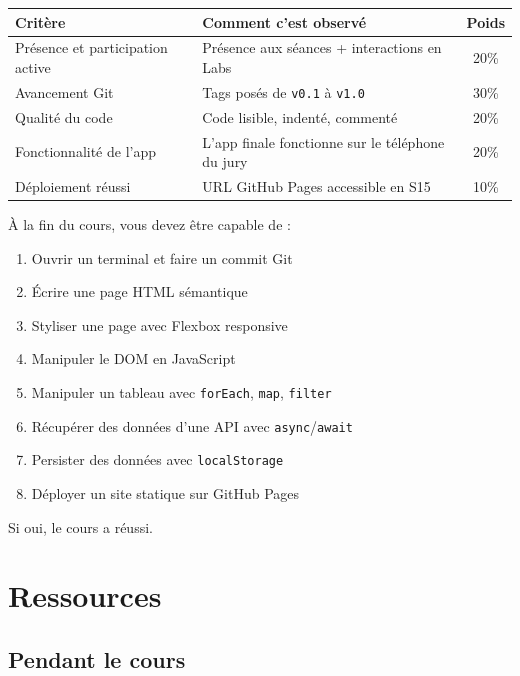 \documentclass[11pt,a4paper]{article}
\begin{document}
\begin{center}
\begin{tabular}{lp{8cm}c}
\toprule
\textbf{Critère} & \textbf{Comment c'est observé} & \textbf{Poids} \\
\midrule
Présence et participation active & Présence aux séances + interactions en Labs & 20\% \\
Avancement Git & Tags posés de \texttt{v0.1} à \texttt{v1.0} & 30\% \\
Qualité du code & Code lisible, indenté, commenté & 20\% \\
Fonctionnalité de l'app & L'app finale fonctionne sur le téléphone du jury & 20\% \\
Déploiement réussi & URL GitHub Pages accessible en S15 & 10\% \\
\bottomrule
\end{tabular}
\end{center}

\begin{retenirbox}
À la fin du cours, vous devez être capable de :
\begin{enumerate}[leftmargin=*,nosep]
  \item Ouvrir un terminal et faire un commit Git
  \item Écrire une page HTML sémantique
  \item Styliser une page avec Flexbox responsive
  \item Manipuler le DOM en JavaScript
  \item Manipuler un tableau avec \texttt{forEach}, \texttt{map}, \texttt{filter}
  \item Récupérer des données d'une API avec \texttt{async}/\texttt{await}
  \item Persister des données avec \texttt{localStorage}
  \item Déployer un site statique sur GitHub Pages
\end{enumerate}
Si oui, le cours a réussi.
\end{retenirbox}

\newpage

\section{Ressources}

\subsection{Pendant le cours}
\end{document}
